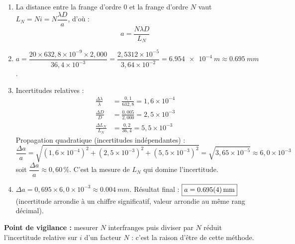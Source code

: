\documentclass[11pt]{article}
\begin{document}
\begin{corrige}
\begin{enumerate}
    \item La distance entre la frange d'ordre 0 et la frange d'ordre $N$ vaut $L_N = N i = N\dfrac{\lambda D}{a}$, d'où :
    \[ \boxed{a = \frac{N\lambda D}{L_N}} \]
    \item $a = \dfrac{20 \times 632,8\times10^{-9} \times 2,000}{36,4\times10^{-3}} = \dfrac{2,5312\times10^{-5}}{3,64\times10^{-2}} = \SI{6,954e-4}{m} \approx \SI{0,695}{mm}$.
    \item Incertitudes relatives :
    \begin{align*}
    \frac{\Delta \lambda}{\lambda} &= \frac{0,1}{632,8} = 1,6\times10^{-4} \\
    \frac{\Delta D}{D} &= \frac{0,005}{2,000} = 2,5\times10^{-3} \\
    \frac{\Delta L_N}{L_N} &= \frac{0,2}{36,4} = 5,5\times10^{-3}
    \end{align*}
    Propagation quadratique (incertitudes indépendantes) :
    \[ \frac{\Delta a}{a} = \sqrt{(1,6\times10^{-4})^2 + (2,5\times10^{-3})^2 + (5,5\times10^{-3})^2} = \sqrt{3,65\times10^{-5}} \approx 6,0\times10^{-3} \]
    soit $\dfrac{\Delta a}{a} \approx 0,60\,\%$. C'est la mesure de $L_N$ qui domine l'incertitude.
    \item $\Delta a = 0,695 \times 6,0\times10^{-3} \approx \SI{0,004}{mm}$.
    Résultat final : $\boxed{a = \SI{0,695 \pm 0,004}{mm}}$ (incertitude arrondie à un chiffre significatif, valeur arrondie au même rang décimal).
\end{enumerate}
\textbf{Point de vigilance :} mesurer $N$ interfranges puis diviser par $N$ réduit l'incertitude relative sur $i$ d'un facteur $N$ : c'est la raison d'être de cette méthode.
\end{corrige}
\end{document}

